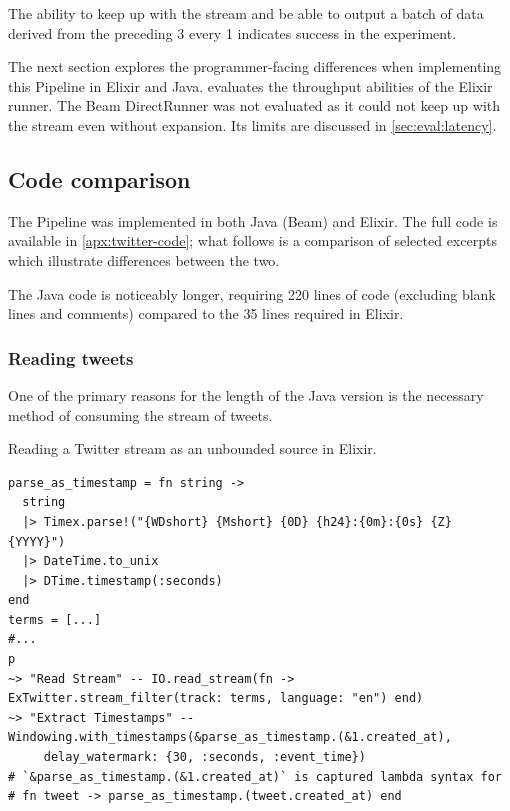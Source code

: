 The ability to keep up with the stream and be able to output a batch of data derived from the preceding \SI{3}{\min} every \SI{1}{\min} indicates success in the experiment.

The next section explores the programmer-facing differences when implementing this Pipeline in Elixir and Java.
 evaluates the throughput abilities of the Elixir runner.
The Beam DirectRunner was not evaluated as it could not keep up with the stream even without expansion.
Its limits are discussed in \cref{sec:eval:latency}.

\subsection{Code comparison}\label{sec:eval:twitter:code}

The Pipeline was implemented in both Java (Beam) and Elixir.
The full code is available in \cref{apx:twitter-code}; what follows is a comparison of selected excerpts which illustrate differences between the two.

The Java code is noticeably longer, requiring 220 lines of code (excluding blank lines and comments) compared to the 35 lines required in Elixir.

\subsubsection{Reading tweets}

One of the primary reasons for the length of the Java version is the necessary method of consuming the stream of tweets.

\begin{codelisting}
	\caption{Reading a Twitter stream as an unbounded source in Elixir.}
	\label{lst:eval:twitter-readstream-elixir}
	\begin{verbatim}
parse_as_timestamp = fn string ->
  string
  |> Timex.parse!("{WDshort} {Mshort} {0D} {h24}:{0m}:{0s} {Z} {YYYY}")
  |> DateTime.to_unix
  |> DTime.timestamp(:seconds)
end
terms = [...]
#...
p
~> "Read Stream" -- IO.read_stream(fn -> ExTwitter.stream_filter(track: terms, language: "en") end)
~> "Extract Timestamps" -- Windowing.with_timestamps(&parse_as_timestamp.(&1.created_at),
     delay_watermark: {30, :seconds, :event_time})
# `&parse_as_timestamp.(&1.created_at)` is captured lambda syntax for
# fn tweet -> parse_as_timestamp.(tweet.created_at) end
	\end{verbatim}
\end{codelisting}

